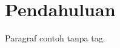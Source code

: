 \documentclass{book}
\begin{document}
\chapter{Pendahuluan}
Paragraf contoh tanpa tag.
\end{document}
